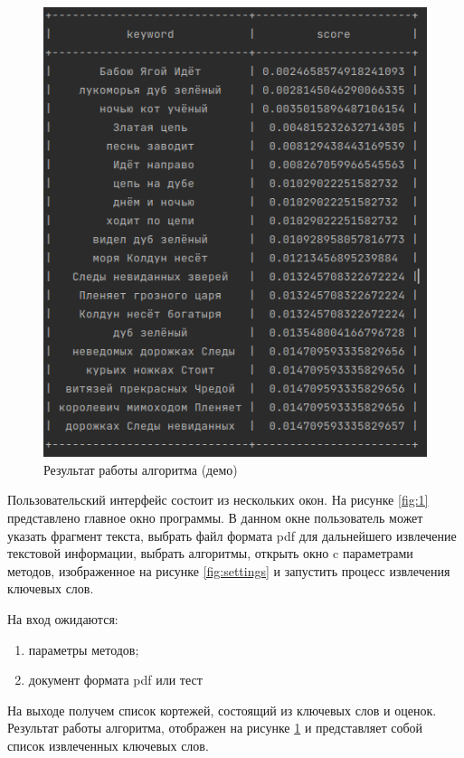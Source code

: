 \begin{figure}[!h]
	\centering
	\includegraphics[width=1\linewidth]{src/img/programm/result}
	\caption{Результат работы алгоритма (демо)}
	\label{fig:result}
\end{figure}

Пользовательский интерфейс состоит из нескольких окон.
На рисунке \ref{fig:1} представлено главное окно программы.
В данном окне пользователь может указать фрагмент текста, выбрать файл формата pdf для дальнейшего извлечение текстовой информации, выбрать алгоритмы, открыть окно c параметрами методов, изображенное на рисунке \ref{fig:settings} и запустить процесс извлечения ключевых слов.

На вход ожидаются:
\begin{enumerate}
	\item параметры методов;
	\item документ формата pdf или тест
\end{enumerate}
На выходе получем список кортежей, состоящий из ключевых слов и оценок.
Результат работы алгоритма, отображен на рисунке \ref{fig:result} и представляет собой список извлеченных ключевых слов.

